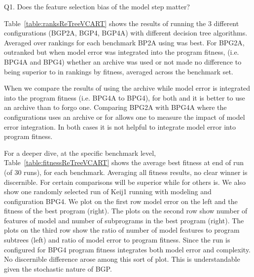 Q1. Does the feature selection bias of the model step matter? 



Table~\ref{table:ranksReTreeVCART} shows the results of running the 3 different configurations (BGP2A, BGP4, BGP4A) with different decision tree algorithms.  Averaged over rankings for each benchmark  BP2A using \REPTREE was best. For BPG2A, \REPTREE outranked \SCIKIT but when model error was integrated into the program fitness, (i.e. BPG4A and BPG4) whether an archive was used or not made no difference to \SCIKIT being superior to \REPTREE  in rankings by fitness, averaged across the benchmark set.  

When we compare the results of using the archive while model error is integrated into the program fitness (i.e.  BPG4A to BPG4), for both \REPTREE and \SCIKIT it is better to use an archive than to forgo one.  Comparing BPG2A with BPG4A where the configurations uses an archive \SCIKIT or for \REPTREE allows one to measure the impact of model error integration.  In both cases it is not helpful to integrate model error into program fitness. 

For a deeper dive, at the specific benchmark level, Table~\ref{table:fitnessReTreeVCART} shows the average best fitness at end of run (of 30 runs), for each benchmark.   Averaging all fitness results, no clear winner is  discernible. For certain comparisons \SCIKIT will be superior while for others \REPTREE is.   We also show one randomly selected run of Keij1 running with \REPTREE modeling and configuration BPG4.   We plot on the first row  model error on the left and the fitness of the best program (right).  The plots on the second row show number of features of model  and number of subprograms in the best program (right). The plots on the third row show the ratio of number of model features to program subtrees (left) and ratio of model error to program fitness. Since the run is configured for  BPG4 program fitness integrates both model error and complexity.  No discernible difference arose among this sort of plot. This is understandable given the stochastic nature of BGP.



